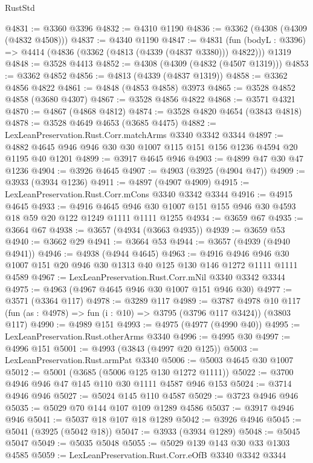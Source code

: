 \begin{lexlean}{RustStd}
\begin{coremodule}
@4831 := @3360 @3396
@4832 := @4310 @1190
@4836 := @3362 (@4308 (@4309 (@4832 @4508)))
@4837 := @4340 @1190
@4847 := @4831
    (fun (bodyL : @3396) => @4414 (@4836 (@3362 (@4813 (@4339 (@4837 @3380))) @4822)))
    @1319
@4848 := @3528 @4413
@4852 := @4308 (@4309 (@4832 (@4507 @1319)))
@4853 := @3362 @4852
@4856 := @4813 (@4339 (@4837 @1319))
@4858 := @3362 @4856 @4822
@4861 := @4848 (@4853 @4858) @3973
@4865 := @3528 @4852 @4858 (@3680 @4307)
@4867 := @3528 @4856 @4822
@4868 := @3571 @4321
@4870 := @4867 (@4868 @4812)
@4874 := @3528 @4820 @4654 (@3843 @4818)
@4878 := @3528 @4649 @4653 (@3685 @4475)
@4882 := LexLeanPreservation.Rust.Corr.matchArms @3340 @3342 @3344
@4897 := @4882 @4645 @946 @946 @30 @30 @1007 @115 @151 @156 @1236 @4594 @20 @1195 @40 @1201
@4899 := @3917 @4645 @946
@4903 := @4899 @47 @30 @47 @1236
@4904 := @3926 @4645
@4907 := @4903 (@3925 (@4904 @47))
@4909 := @3933 (@3934 @1236)
@4911 := @4897 (@4907 @4909)
@4915 := LexLeanPreservation.Rust.Corr.mCons @3340 @3342 @3344
@4916 := @4915 @4645
@4933 := @4916
    @4645
    @946
    @30
    @1007
    @151
    @155
    @946
    @30
    @4593
    @18
    @59
    @20
    @122
    @1249
    @1111
    @1111
    @1255
@4934 := @3659 @67
@4935 := @3664 @67
@4938 := @3657 (@4934 (@3663 @4935))
@4939 := @3659 @53
@4940 := @3662 @29
@4941 := @3664 @53
@4944 := @3657 (@4939 (@4940 @4941))
@4946 := @4938 (@4944 @4645)
@4963 := @4916
    @4946
    @946
    @30
    @1007
    @151
    @20
    @946
    @30
    @1313
    @40
    @125
    @130
    @146
    @1272
    @1111
    @1111
    @4589
@4967 := LexLeanPreservation.Rust.Corr.mNil @3340 @3342 @3344
@4975 := @4963 (@4967 @4645 @946 @30 @1007 @151 @946 @30)
@4977 := @3571 (@3364 @117)
@4978 := @3289 @117
@4989 := @3787
    @4978
    @10
    @117
    (fun (as : @4978) => fun (i : @10) => @3795 (@3796 @117 @3424))
    (@3803 @117)
@4990 := @4989 @151
@4993 := @4975 (@4977 (@4990 @40))
@4995 := LexLeanPreservation.Rust.otherArms @3340
@4996 := @4995 @30
@4997 := @4996 @151
@5001 := @4993 (@3843 (@4997 @20 @125))
@5003 := LexLeanPreservation.Rust.armPat @3340
@5006 := @5003 @4645 @30 @1007
@5012 := @5001 (@3685 (@5006 @125 @130 @1272 @1111))
@5022 := @3700 @4946 @946 @47 @145 @110 @30 @1111 @4587 @946 @153
@5024 := @3714 @4946 @946
@5027 := @5024 @145 @110 @4587
@5029 := @3723 @4946 @946
@5035 := @5029 @70 @144 @107 @109 @1289 @4586
@5037 := @3917 @4946 @946
@5041 := @5037 @18 @107 @18 @1289
@5042 := @3926 @4946
@5045 := @5041 (@3925 (@5042 @18))
@5047 := @3933 (@3934 @1289)
@5048 := @5045 @5047
@5049 := @5035 @5048
@5055 := @5029 @139 @143 @30 @33 @1303 @4585
@5059 := LexLeanPreservation.Rust.Corr.eOfB @3340 @3342 @3344

\end{coremodule}
\end{lexlean}
